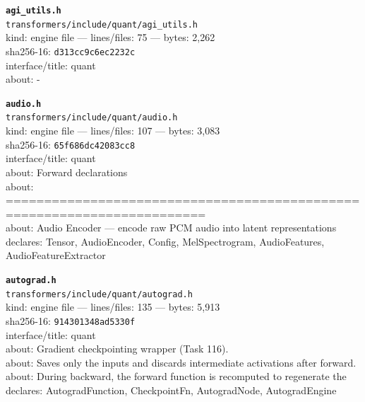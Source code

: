 \noindent\textbf{\texttt{agi\_utils.h}}\\
\texttt{transformers/include/quant/agi\_utils.h}\\
kind: engine file --- lines/files: 75 --- bytes: 2,262\\
sha256-16: \texttt{d313cc9c6ec2232c}\\
interface/title: quant\\
about: -\\
\vspace*{6.0pt}

\noindent\textbf{\texttt{audio.h}}\\
\texttt{transformers/include/quant/audio.h}\\
kind: engine file --- lines/files: 107 --- bytes: 3,083\\
sha256-16: \texttt{65f686dc42083cc8}\\
interface/title: quant\\
about: Forward declarations\\
about: ========================================================================\\
about: Audio Encoder — encode raw PCM audio into latent representations\\
declares: Tensor, AudioEncoder, Config, MelSpectrogram, AudioFeatures, AudioFeatureExtractor\\
\vspace*{6.0pt}
\newpage

\noindent\textbf{\texttt{autograd.h}}\\
\texttt{transformers/include/quant/autograd.h}\\
kind: engine file --- lines/files: 135 --- bytes: 5,913\\
sha256-16: \texttt{914301348ad5330f}\\
interface/title: quant\\
about: Gradient checkpointing wrapper (Task 116).\\
about: Saves only the inputs and discards intermediate activations after forward.\\
about: During backward, the forward function is recomputed to regenerate the\\
declares: AutogradFunction, CheckpointFn, AutogradNode, AutogradEngine\\
\vspace*{6.0pt}

